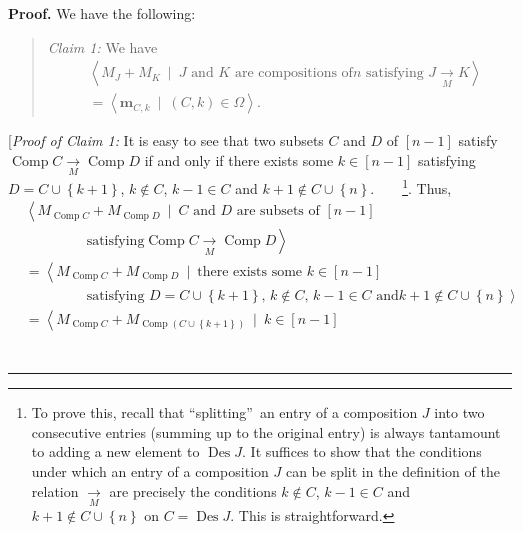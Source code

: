 \documentclass[numbers=enddot,12pt,final,onecolumn,notitlepage]{scrartcl}%
\theoremstyle{definition}
\newenvironment{statement}{\begin{quote}}{\end{quote}}
\newenvironment{proof}[1][Proof]{\noindent\textbf{#1.} }{\ \rule{0.5em}{0.5em}}
\begin{document}
\begin{proof}
We have the following:

\begin{statement}
\textit{Claim 1:} We have%
\begin{align*}
&  \left\langle M_{J}+M_{K}\ \mid\ J\text{ and }K\text{ are compositions of
}n\text{ satisfying }J\underset{M}{\rightarrow}K\right\rangle \\
&  =\left\langle \mathbf{m}_{C,k}\ \mid\ \left(  C,k\right)  \in
\Omega\right\rangle .
\end{align*}

\end{statement}

[\textit{Proof of Claim 1:} It is easy to see that two subsets $C$ and $D$ of
$\left[  n-1\right]  $ satisfy $\operatorname*{Comp}C\underset{M}{\rightarrow
}\operatorname*{Comp}D$ if and only if there exists some $k\in\left[
n-1\right]  $ satisfying $D=C\cup\left\{  k+1\right\}  $, $k\notin C$, $k-1\in
C$ and $k+1\notin C\cup\left\{  n\right\}  $.\ \ \ \ \footnote{To prove this,
recall that \textquotedblleft splitting\textquotedblright\ an entry of a
composition $J$ into two consecutive entries (summing up to the original
entry) is always tantamount to adding a new element to $\operatorname*{Des}J$.
It suffices to show that the conditions under which an entry of a composition
$J$ can be split in the definition of the relation $\underset{M}{\rightarrow}$
are precisely the conditions $k\notin C$, $k-1\in C$ and $k+1\notin
C\cup\left\{  n\right\}  $ on $C=\operatorname*{Des}J$. This is
straightforward.}. Thus,%
\begin{align*}
&  \left\langle M_{\operatorname*{Comp}C}+M_{\operatorname*{Comp}D}%
\ \mid\ C\text{ and }D\text{ are subsets of }\left[  n-1\right]  \right. \\
&  \ \ \ \ \ \ \ \ \ \ \ \ \ \ \ \ \ \ \ \ \left.  \text{satisfying
}\operatorname*{Comp}C\underset{M}{\rightarrow}\operatorname*{Comp}%
D\right\rangle \\
&  =\left\langle M_{\operatorname*{Comp}C}+M_{\operatorname*{Comp}D}%
\ \mid\ \text{there exists some }k\in\left[  n-1\right]  \right. \\
&  \ \ \ \ \ \ \ \ \ \ \ \ \ \ \ \ \ \ \ \ \left.  \text{satisfying }%
D=C\cup\left\{  k+1\right\}  \text{, }k\notin C\text{, }k-1\in C\text{ and
}k+1\notin C\cup\left\{  n\right\}  \right\rangle \\
&  =\left\langle M_{\operatorname*{Comp}C}+M_{\operatorname*{Comp}\left(
C\cup\left\{  k+1\right\}  \right)  }\ \mid\ k\in\left[  n-1\right]  \right.
\\

\end{align*}
\end{proof}
\end{document}
